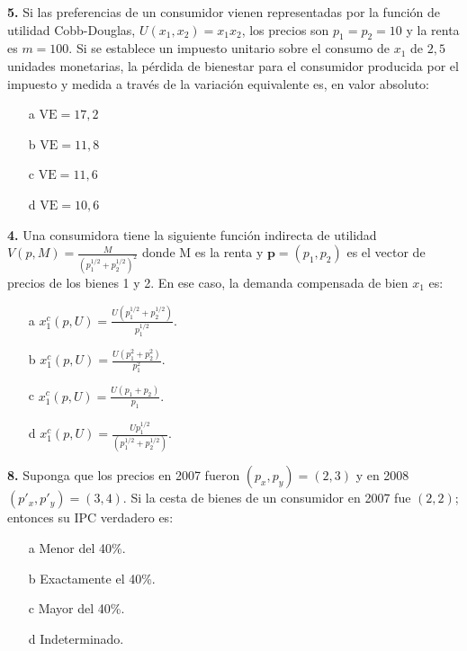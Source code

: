 \documentclass{nuevotema}
\begin{document}
\preguntas


\textbf{5.} Si las preferencias de un consumidor vienen representadas por la función de utilidad Cobb-Douglas, $U(x_1, x_2) = x_1 x_2$, los precios son $p_1 = p_2 = 10$ y la renta es $m=100$. Si se establece un impuesto unitario sobre el consumo de $x_1$ de $2,5$ unidades monetarias, la pérdida de bienestar para el consumidor producida por el impuesto y medida a través de la variación equivalente es, en valor absoluto:

\begin{itemize}
	\item[a] $\text{VE} = 17,2$
	\item[b] $\text{VE} = 11,8$
	\item[c] $\text{VE} = 11,6$
	\item[d] $\text{VE} = 10,6$
\end{itemize}


\textbf{4.} Una consumidora tiene la siguiente función indirecta de utilidad $V(p, M) = \frac{M}{(p_1^{1/2} + p_2^{1/2})^2}$ donde M es la renta y $\textbf{p}=(p_1, p_2)$ es el vector de precios de los bienes 1 y 2. En ese caso, la demanda compensada de bien $x_1$ es:

\begin{enumerate}
	\item[a] $x_1^c(p,U) = \frac{U \left( p_1^{1/2} + p_2^{1/2} \right) }{p_1^{1/2}}$.
	\item[b] $x_1^c(p,U) = \frac{U \left( p_1^2 + p_2^2 \right) }{p_1^2}. $
	\item[c] $x_1^c(p,U) = \frac{U \left( p_1 + p_2 \right) }{p_1}. $
	\item[d] $x_1^c(p,U) = \frac{U p_1^{1/2}}{ \left( p_1^{1/2} + p_2^{1/2} \right)}. $
\end{enumerate}

\textbf{8.} Suponga que los precios en 2007 fueron $(p_x, p_y) = (2,3)$ y en 2008 $(p'_x, p'_y) = (3,4)$. Si la cesta de bienes de un consumidor en 2007 fue $(2,2)$; entonces su IPC verdadero es:
\begin{enumerate}
	\item[a] Menor del 40\%.
	\item[b] Exactamente el 40\%.
	\item[c] Mayor del 40\%.
	\item[d] Indeterminado.
\end{enumerate}
\end{document}
